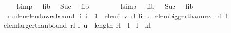 \begin{isabellebody}
%
\isadelimproof
\ \ %
\endisadelimproof
%
\isatagproof
{}\isamarkupfalse%
%
\endisatagproof
{\isafoldproof}%
%
\isadelimproof
\isanewline
%
\endisadelimproof
{}\isamarkupfalse%
\ l{}{}{}{}{}{}{\isacharbrackleft}simp{\isacharbrackright}{\isacharcolon}\ {\isachardoublequoteopen}{}{}\ {\isacharasterisk}\ {\isacharparenleft}fib\ {}{}\ {\isacharminus}\ Suc\ {}{\isacharparenright}\ {\isacharplus}\ {\isacharparenleft}fib{}\ {}{}\ {\isacharminus}\ {}{}{\isacharparenright}\ {\isacharequal}\ {}{}{}{}{}{}{\isachardoublequoteclose}\isanewline
%
\isadelimproof
\ \ %
\endisadelimproof
%
\isatagproof
{}\isamarkupfalse%
%
\endisatagproof
{\isafoldproof}%
%
\isadelimproof
\isanewline
%
\endisadelimproof
{}\isamarkupfalse%
\ l{}{}{}{}{\isacharbrackleft}simp{\isacharbrackright}{\isacharcolon}\ {\isachardoublequoteopen}{}{}\ {\isacharasterisk}\ {\isacharparenleft}fib\ {}{}\ {\isacharminus}\ Suc\ {}{\isacharparenright}\ {\isacharplus}\ {\isacharparenleft}fib{}\ {}{}\ {\isacharminus}\ {}{}{\isacharparenright}\ {\isacharequal}\ {}{}{}{}{}{}{}{}{}{}{\isachardoublequoteclose}\isanewline
%
\isadelimproof
\ \ %
\endisadelimproof
%
\isatagproof
{}\isamarkupfalse%
%
\endisatagproof
{\isafoldproof}%
%
\isadelimproof
\isanewline
%
\endisadelimproof
\isanewline
\isanewline
{}\isamarkupfalse%
\ run{\isacharunderscore}len{\isacharunderscore}elem{\isacharunderscore}lower{\isacharunderscore}bound{\isacharcolon}\ {\isachardoublequoteopen}\isanewline
{\isasymforall}i{\isachardot}\ {}{\isasymle}i\ {\isasymand}\ i{\isasymle}l\ {\isasymlongrightarrow}\ elem{\isacharunderscore}inv\ rl\ {\isacharparenleft}l{\isacharminus}i{\isacharparenright}\ u\ {\isasymLongrightarrow}\isanewline
elem{\isacharunderscore}bigger{\isacharunderscore}than{\isacharunderscore}next\ rl\ {\isacharparenleft}l{\isacharminus}{}{\isacharparenright}\ {\isasymLongrightarrow}\isanewline
elem{\isacharunderscore}larger{\isacharunderscore}than{\isacharunderscore}bound\ rl\ {\isacharparenleft}l{\isacharminus}{}{\isacharparenright}\ u\ {\isasymLongrightarrow}\ length\ rl\ {\isacharequal}\ l\ {\isasymLongrightarrow}\ l{\isasymge}{}\ {\isasymLongrightarrow}\ k{\isacharless}l\ \isanewline

\end{isabellebody}

